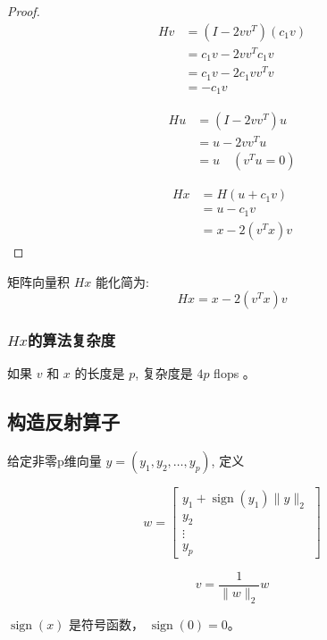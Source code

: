 \begin{proof}
    $$\begin{aligned}
        Hv &= (I-2 v v^{T}) (c_1 v) \\
        &= c_1 v - 2 v v^T c_1 v \\
        & = c_1 v - 2 c_1 v v^T v \\
        & = -c_1 v
    \end{aligned}$$

    $$\begin{aligned}
        Hu &= (I - 2 v v^T) u \\
        &= u - 2 v v^T u \\
        & = u \quad (v^T u = 0) 
    \end{aligned}$$

    $$\begin{aligned}
        Hx &= H(u + c_1v) \\
        &= u - c_1 v \\
        &= x - 2(v^Tx)v
    \end{aligned}$$
\end{proof}

矩阵向量积 $ H x $ 能化简为:
$$
H x=x-2\left(v^{T} x\right) v
$$

\subsubsection{$Hx$的算法复杂度}

\begin{theorem}
    如果 $ v $ 和 $ x $ 的长度是 $ p $, 复杂度是 $ 4 p $ flops 。
\end{theorem}


\subsection{构造反射算子}

给定非零p维向量 $ y=\left(y_{1}, y_{2}, \ldots, y_{p}\right) $, 定义

\begin{definition}
    $$w=\left[\begin{array}{c}
        y_{1}+\operatorname{sign}\left(y_{1}\right)\|y\|_{2} \\
        y_{2} \\
        \vdots \\
        y_{p}
        \end{array}\right]$$

    $$v=\frac{1}{\|w\|_{2}} w$$

    $\operatorname{sign}(x)$ 是符号函数， $\operatorname{sign}(0)=0$。
\end{definition}

